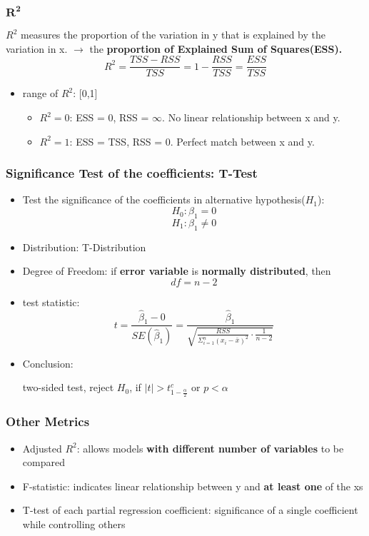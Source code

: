 \subsubsection{$\mathbf{R^2}$}
$R^2$ measures the proportion of the variation in y that is explained by the variation in x. $\rightarrow$ the \textbf{proportion of Explained Sum of Squares(ESS).}
$$R^2 = \frac{TSS - RSS}{TSS} = 1 - \frac{RSS}{TSS} = \frac{ESS}{TSS}$$ 
\begin{itemize}
	\item range of $R^2$: [0,1]
	\begin{itemize}
		\item $R^2 = 0$: ESS = 0, RSS = $\infty$. No linear relationship between x and y.
		\item $R^2 = 1$: ESS = TSS, RSS = 0. Perfect match between x and y.
	\end{itemize}
\end{itemize}

\subsubsection{Significance Test of the coefficients: T-Test}
\begin{itemize}
	\item Test the significance of the coefficients in alternative hypothesis($H_1$):
	$$H_0: \beta_1 = 0$$
	$$H_1: \beta_1 \neq 0$$
	\item Distribution: T-Distribution
	\item Degree of Freedom: if \textbf{error variable} is \textbf{normally distributed}, then $$df = n - 2 $$
	\item test statistic:
	\large{$$t = \frac{\hat{\beta}_1 - 0}{SE(\hat{\beta}_1)} = \dfrac{\hat{\beta}_1}{\sqrt{\frac{RSS}{\Sigma_{i=1}^n (x_i - \bar{x})^2} \cdot \frac{1}{n-2}}}$$}
	\item Conclusion: 
	
	two-sided test, reject $H_0$, if $|t| > t^c_{1-\frac{\alpha}{2}}$ or $p < \alpha$
	
\end{itemize}
\subsubsection{Other Metrics}
\begin{itemize}
	\item Adjusted $R^2$: allows models \textbf{with different number of variables} to be compared
	\item F-statistic: indicates linear relationship between y and \textbf{at least one} of the xs
	\item T-test of each partial regression coefficient: significance of a single coefficient while controlling others
\end{itemize}



